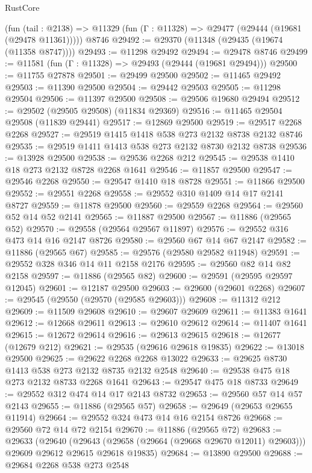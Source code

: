 \begin{lexlean}{RustCore}
\begin{coremodule}
    (fun (tail : @2138) => @11329 (fun (Γ : @11328) => @29477 (@29444 (@19681 (@29478 @11361)))))
    @8746
@29492 := @29370 (@11348 (@29435 (@19674 (@11358 @8747))))
@29493 := @11298 @29492
@29494 := @29478 @8746
@29499 := @11581 (fun (Γ : @11328) => @29493 (@29444 (@19681 @29494)))
@29500 := @11755 @27878
@29501 := @29499 @29500
@29502 := @11465 @29492
@29503 := @11390 @29500
@29504 := @29442 @29503
@29505 := @11298 @29504
@29506 := @11397 @29500
@29508 := @29506 @19680 @29494
@29512 := @29502 (@29505 @29508) (@11834 @29369)
@29516 := @11465 @29504 @29508 (@11839 @29441)
@29517 := @12869 @29500
@29519 := @29517 @2268 @2268
@29527 := @29519 @1415 @1418 @538 @273 @2132 @8738 @2132 @8746
@29535 := @29519 @1411 @1413 @538 @273 @2132 @8730 @2132 @8738
@29536 := @13928 @29500
@29538 := @29536 @2268 @212
@29545 := @29538 @1410 @18 @273 @2132 @8728 @2268 @1641
@29546 := @11857 @29500
@29547 := @29546 @2268
@29550 := @29547 @1410 @18 @8728
@29551 := @11866 @29500
@29552 := @29551 @2268
@29558 := @29552 @310 @1409 @14 @17 @2141 @8727
@29559 := @11878 @29500
@29560 := @29559 @2268
@29564 := @29560 @52 @14 @52 @2141
@29565 := @11887 @29500
@29567 := @11886 (@29565 @52)
@29570 := @29558 (@29564 @29567 @11897)
@29576 := @29552 @316 @473 @14 @16 @2147 @8726
@29580 := @29560 @67 @14 @67 @2147
@29582 := @11886 (@29565 @67)
@29585 := @29576 (@29580 @29582 @11948)
@29591 := @29552 @328 @346 @14 @11 @2158 @2176
@29595 := @29560 @82 @14 @82 @2158
@29597 := @11886 (@29565 @82)
@29600 := @29591 (@29595 @29597 @12045)
@29601 := @12187 @29500
@29603 := @29600 (@29601 @2268)
@29607 := @29545 (@29550 (@29570 (@29585 @29603)))
@29608 := @11312 @212
@29609 := @11509 @29608
@29610 := @29607 @29609
@29611 := @11383 @1641
@29612 := @12668 @29611
@29613 := @29610 @29612
@29614 := @11407 @1641
@29615 := @12672 @29614
@29616 := @29613 @29615
@29618 := @12677 (@12679 @212)
@29621 := @29535 (@29616 @29618 @19835)
@29622 := @13018 @29500
@29625 := @29622 @2268 @2268 @13022
@29633 := @29625 @8730 @1413 @538 @273 @2132 @8735 @2132 @2548
@29640 := @29538 @475 @18 @273 @2132 @8733 @2268 @1641
@29643 := @29547 @475 @18 @8733
@29649 := @29552 @312 @474 @14 @17 @2143 @8732
@29653 := @29560 @57 @14 @57 @2143
@29655 := @11886 (@29565 @57)
@29658 := @29649 (@29653 @29655 @11914)
@29664 := @29552 @324 @473 @14 @16 @2154 @8726
@29668 := @29560 @72 @14 @72 @2154
@29670 := @11886 (@29565 @72)
@29683 := @29633
    (@29640
      (@29643 (@29658 (@29664 (@29668 @29670 @12011) @29603)))
      @29609
      @29612
      @29615
      @29618
      @19835)
@29684 := @13890 @29500
@29688 := @29684 @2268 @538 @273 @2548

\end{coremodule}
\end{lexlean}
